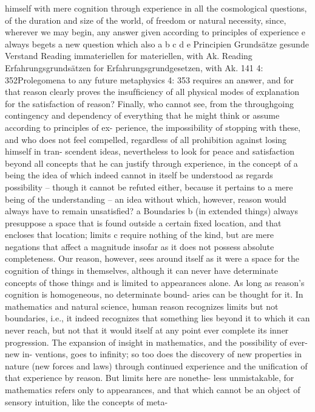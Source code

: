 himself with mere cognition through experience in all the cosmological
questions, of the duration and size of the world, of freedom or natural
necessity, since, wherever we may begin, any answer given according
to principles of experience e always begets a new question which also
a
b
c
d
e
Principien
Grundsätze
gesunde Verstand
Reading immateriellen for materiellen, with Ak.
Reading Erfahrungsgrundsätzen for Erfahrungsgrundgesetzen, with Ak.
141
4: 352Prolegomena to any future metaphysics
4: 353
requires an answer, and for that reason clearly proves the insufﬁciency
of all physical modes of explanation for the satisfaction of reason? Finally,
who cannot see, from the throughgoing contingency and dependency of
everything that he might think or assume according to principles of ex-
perience, the impossibility of stopping with these, and who does not feel
compelled, regardless of all prohibition against losing himself in tran-
scendent ideas, nevertheless to look for peace and satisfaction beyond
all concepts that he can justify through experience, in the concept of a
being the idea of which indeed cannot in itself be understood as regards
possibility – though it cannot be refuted either, because it pertains to
a mere being of the understanding – an idea without which, however,
reason would always have to remain unsatisﬁed? a
Boundaries b (in extended things) always presuppose a space that is
found outside a certain ﬁxed location, and that encloses that location;
limits c require nothing of the kind, but are mere negations that affect
a magnitude insofar as it does not possess absolute completeness. Our
reason, however, sees around itself as it were a space for the cognition of
things in themselves, although it can never have determinate concepts
of those things and is limited to appearances alone.
As long as reason’s cognition is homogeneous, no determinate bound-
aries can be thought for it. In mathematics and natural science, human
reason recognizes limits but not boundaries, i.e., it indeed recognizes
that something lies beyond it to which it can never reach, but not that
it would itself at any point ever complete its inner progression. The
expansion of insight in mathematics, and the possibility of ever-new in-
ventions, goes to inﬁnity; so too does the discovery of new properties
in nature (new forces and laws) through continued experience and the
uniﬁcation of that experience by reason. But limits here are nonethe-
less unmistakable, for mathematics refers only to appearances, and that
which cannot be an object of sensory intuition, like the concepts of meta-
